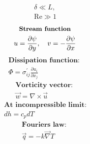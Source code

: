 \documentclass[10pt, a4paper]{article}
\newcommand{\derivative}[2]{\frac{\partial #1}{\partial #2}}
\begin{document}
\begin{multicols*}{2}
\begin{gather*}
        \delta \ll L, \\
        \text{Re} \gg 1
    \end{gather*}
    \begin{gather*}
        \textbf{\small Stream function} \\
        u = \derivative{\psi}{y}, \quad v = -\derivative{\psi}{x} %
    \end{gather*}
    \begin{gather*}
        \textbf{Dissipation function: } \\ %
        \Phi = \sigma^{'}_{ij}\derivative{u_{i}}{x_{j}}
    \end{gather*}
    \begin{gather*}
        \textbf{Vorticity vector: } \\ %
        \vec{w} = \nabla \times \vec{u}
    \end{gather*}
    \begin{gather*}
        \textbf{At incompressible limit:} \\
        dh = c_pdT
    \end{gather*}
    \begin{gather*}
        \textbf{Fouriers law: } \\
        \vec{q} = -k \vec{\nabla} T
    \end{gather*}
\end{multicols*}
\end{document}
